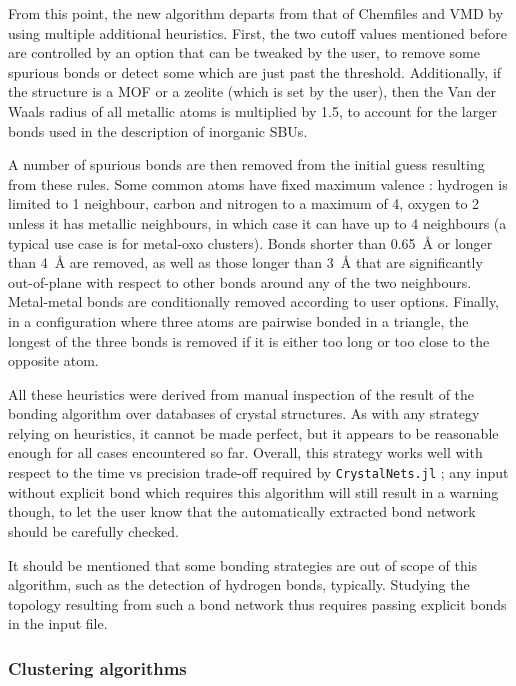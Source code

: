 \documentclass[main.tex]{subfiles}
\begin{document}
From this point, the new algorithm departs from that of Chemfiles and VMD by using multiple additional heuristics. First, the two cutoff values mentioned before are controlled by an option that can be tweaked by the user, to remove some spurious bonds or detect some which are just past the threshold. Additionally, if the structure is a MOF or a zeolite (which is set by the user), then the Van der Waals radius of all metallic atoms is multiplied by 1.5, to account for the larger bonds used in the description of inorganic SBUs.

A number of spurious bonds are then removed from the initial guess resulting from these rules. Some common atoms have fixed maximum valence : hydrogen is limited to 1 neighbour, carbon and nitrogen to a maximum of 4, oxygen to 2 unless it has metallic neighbours, in which case it can have up to 4 neighbours (a typical use case is for metal-oxo clusters). Bonds shorter than \qty{0.65}{\angstrom} or longer than \qty{4}{\angstrom} are removed, as well as those longer than \qty{3}{\angstrom} that are significantly out-of-plane with respect to other bonds around any of the two neighbours. Metal-metal bonds are conditionally removed according to user options. Finally, in a configuration where three atoms are pairwise bonded in a triangle, the longest of the three bonds is removed if it is either too long or too close to the opposite atom.

All these heuristics were derived from manual inspection of the result of the bonding algorithm over databases of crystal structures. As with any strategy relying on heuristics, it cannot be made perfect, but it appears to be reasonable enough for all cases encountered so far. Overall, this strategy works well with respect to the time vs precision trade-off required by \texttt{CrystalNets.jl} ; any input without explicit bond which requires this algorithm will still result in a warning though, to let the user know that the automatically extracted bond network should be carefully checked.

It should be mentioned that some bonding strategies are out of scope of this algorithm, such as the detection of hydrogen bonds, typically. Studying the topology resulting from such a bond network thus requires passing explicit bonds in the input file.



\subsubsection{Clustering algorithms}
\label{clusteringalgorithms}
\end{document}
